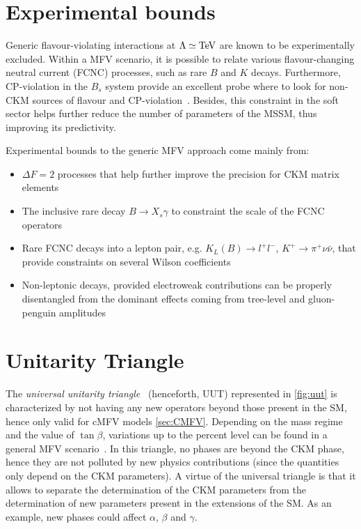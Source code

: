 \section{Experimental bounds}
\label{sec:MFVExp}
Generic flavour-violating interactions at $\Lambda \simeq \rm TeV$ are known to be experimentally excluded. 
Within a MFV scenario, it is possible to relate various flavour-changing neutral current (FCNC) processes, such as rare $B$ and $K$ decays. Furthermore, CP-violation in the $B_s$ system provide an excellent probe where to look for non-CKM sources of flavour and CP-violation~\cite{Altmannshofer:2007cs}. Besides, this constraint in the soft sector helps further reduce the number of parameters of the MSSM, thus improving its predictivity. 

Experimental bounds to the generic MFV approach come mainly from:
\begin{itemize}
\item $\Delta F = 2$ processes that help further improve the precision for CKM matrix elements
\item The inclusive rare decay $B \rightarrow X_s \gamma$  to constraint the scale of the FCNC operators 
\item Rare FCNC decays into a lepton pair, e.g. $K_L(B) \rightarrow l^+ l^-$, $K^+ \rightarrow \pi^+ \nu \bar{\nu}$, that provide constraints on several Wilson coefficients %
\item Non-leptonic decays, provided electroweak contributions can be properly disentangled from the dominant effects coming from tree-level and gluon-penguin amplitudes %
\end{itemize}

\section{Unitarity Triangle}
\label{sec:UT}

The \textit{universal unitarity triangle}~\cite{Buras:2000dm} (henceforth, UUT) represented in \ref{fig:uut} is characterized by not having any new operators beyond those present in the SM, hence only valid for cMFV models \ref{sec:CMFV}. Depending on the mass regime and the value of $\tan{\beta}$, variations up to the percent level can be found in a general MFV scenario~\cite{Altmannshofer:2007cs}. 
In this triangle, no phases are beyond the CKM phase, hence they are not polluted by new physics contributions (since the quantities only depend on the CKM parameters). A virtue of the universal triangle is that it allows to separate the determination of the CKM parameters from the determination of new parameters present in the extensions of the SM. As an example, new phases could affect $\alpha$, $\beta$ and $\gamma$.

